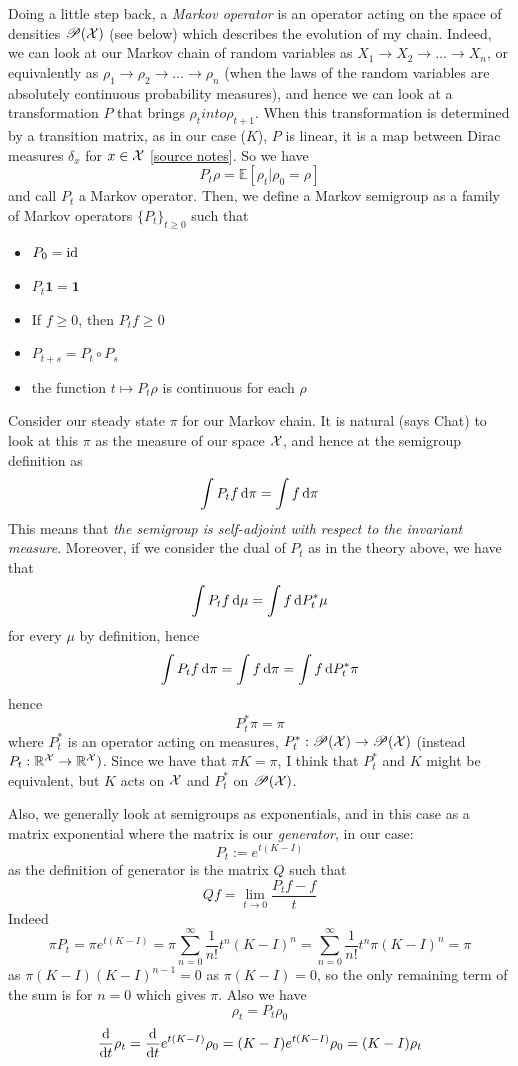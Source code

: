 Doing a little step back, a \emph{Markov operator} is an operator acting on the space of densities $\mathscr{P}(\mathcal{X})$ (see below) which describes the evolution of my chain. Indeed, we can look at our Markov chain of random variables as $X_1 \rightarrow X_2 \rightarrow \ldots \rightarrow X_n$, or equivalently as $\rho_1 \rightarrow \rho_2 \rightarrow \ldots \rightarrow \rho_n$ (when the laws of the random variables are absolutely continuous probability measures), and hence we can look at a transformation $P$ that brings $\rho_t into \rho_{t+1}$. When this transformation is determined by a transition matrix, as in our case ($K$), $P$ is linear, it is a map between Dirac measures $\delta_x$ for $x\in\mathcal{X}$ [\href{https://www.impan.pl/~rams/r48-ladek.pdf}{source notes}]. So we have
\[
P_t\rho=\mathbb{E}[\rho_t|\rho_0=\rho]
\]
and call $P_t$ a Markov operator. Then, we define a Markov semigroup as a family of Markov operators $\{P_t\}_{t\ge0}$ such that
\begin{itemize}
    \item $P_0=\operatorname*{id}$
    \item $P_t\mathbf{1}=\mathbf{1}$
    \item If $f\ge0$, then $P_tf\ge0$
    \item $P_{t+s}=P_t\circ P_s$
    \item the function $t \mapsto P_t\rho$ is continuous for each $\rho$
\end{itemize}
Consider our steady state $\pi$ for our Markov chain. It is natural (says Chat) to look at this $\pi$ as the measure of our space $\mathcal{X}$, and hence at the semigroup definition as
\[
\int P_t f \mathop{}\!\mathrm{d} \pi = \int f \mathop{}\!\mathrm{d} \pi
\]
This means that \emph{the semigroup is self-adjoint with respect to the invariant measure}. Moreover, if we consider the dual of $P_t$ as in the theory above, we have that
\[
\int P_t f \mathop{}\!\mathrm{d} \mu = \int f \mathop{}\!\mathrm{d} P_t^* \mu
\]
for every $\mu$ by definition, hence
\[
\int P_t f \mathop{}\!\mathrm{d} \pi = \int f \mathop{}\!\mathrm{d} \pi = \int f \mathop{}\!\mathrm{d} P_t^* \pi
\]
hence \[ P_t^* \pi = \pi\] where $P_t^*$ is an operator acting on measures, $P_t^*: \mathscr{P}(\mathcal{X}) \to \mathscr{P}(\mathcal{X})$ (instead $P_t:\mathbb{R}^{\mathcal{X}} \to \mathbb{R}^{\mathcal{X}})$. Since we have that $\pi K=\pi$, I think that $P_t^*$ and $K$ might be equivalent, but $K$ acts on $\mathcal{X}$ and $P_t^*$ on $\mathscr{P}(\mathcal{X})$.


Also, we generally look at semigroups as exponentials, and in this case as a matrix exponential where the matrix is our \textit{generator}, in our case:
\[
P_t := e^{t(K-I)}
\]
as the definition of generator is the matrix $Q$ such that
\[
Qf = \lim_{t\to0} \frac{P_tf-f}{t}
\]
Indeed 
\[
\pi P_t = \pi e^{t(K-I)}= \pi \sum_{n=0}^\infty \frac{1}{n!}t^n (K-I)^n = \sum_{n=0}^\infty \frac{1}{n!}t^n \pi (K-I)^n = \pi
\]
as $\pi(K-I)(K-I)^{n-1}=0$ as $\pi(K-I)=0$, so the only remaining term of the sum is for $n=0$ which gives $\pi$. Also we have
\[
\rho_t=P_t\rho_0
\]
\begin{equation}\label{eq: semigroup}
    \frac{\mathop{}\!\mathrm{d}}{\mathop{}\!\mathrm{d} t} \rho_t=\frac{\mathop{}\!\mathrm{d}}{\mathop{}\!\mathrm{d} t}e^{t(K-I)}\rho_0 = (K-I)e^{t(K-I)}\rho_0 =(K-I)\rho_t
\end{equation}

